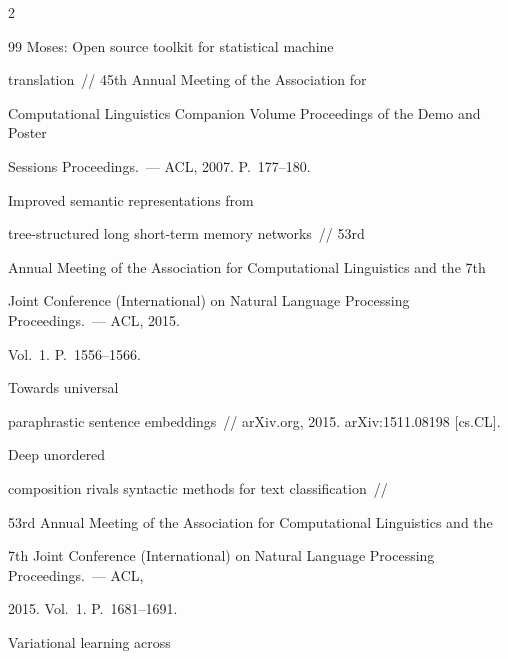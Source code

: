 \begin{multicols}{2}
{{\begin{thebibliography}{99}
 Moses: Open source toolkit for statistical machine 


translation~//  45th Annual Meeting of the Association for 


Computational Linguistics Companion Volume Proceedings of the Demo and Poster 


Sessions Proceedings.~--- ACL, 2007. P.~177--180.










  Improved semantic representations from 


tree-structured long short-term memory networks~// 53rd 


Annual Meeting of the Association for Computational Linguistics and the 7th 


 Joint Conference (International) on Natural Language Processing Proceedings.~--- ACL, 2015. 


Vol.~1. P.~1556--1566.










 Towards universal 


paraphrastic sentence embeddings~// arXiv.org, 2015. arXiv:1511.08198 [cs.CL].













 Deep unordered 


composition rivals syntactic methods for text classification~// 


53rd Annual Meeting of the Association for Computational Linguistics and the 


7th  Joint Conference (International) on Natural Language Processing Proceedings.~--- ACL, 


2015. Vol.~1. P.~1681--1691.







 Variational learning across 



\end{thebibliography}}}
\end{multicols}

